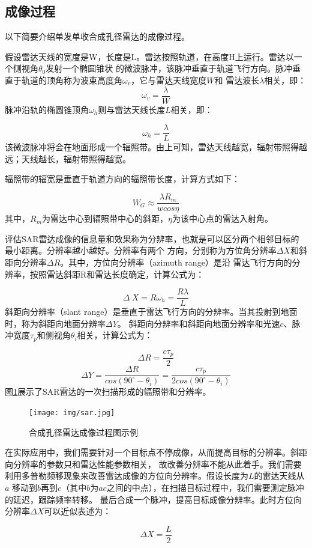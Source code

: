 \documentclass{xduugthesis}
\begin{document}
\subsection{成像过程}
以下简要介绍单发单收合成孔径雷达的成像过程\cite{SAR_Process}。\par
假设雷达天线的宽度是W，长度是L。雷达按照轨道，在高度H上运行。雷达以一个侧视角$\theta_0$发射一个椭圆锥状
的微波脉冲，该脉冲垂直于轨道飞行方向。脉冲垂直于轨道的顶角称为波束高度角$\omega_v$，它与雷达天线宽度$W$和
雷达波长$\lambda$相关，即：
\begin{equation}\omega_v=\frac{\lambda}{W}\end{equation}
脉冲沿轨的椭圆锥顶角$\omega_h$则与雷达天线长度$L$相关，即：\par
\begin{equation}\omega_h=\frac{\lambda}{L}\end{equation}
该微波脉冲将会在地面形成一个辐照带。由上可知，雷达天线越宽，辐射带照得越远；天线越长，辐射带照得越宽。\par
辐照带的辐宽是垂直于轨道方向的辐照带长度，计算方式如下：\par
\begin{equation}W_G\approx\frac{{\lambda}R_m}{wcos\eta}\end{equation}
其中，$R_m$为雷达中心到辐照带中心的斜距，$\eta$为该中心点的雷达入射角。\par
评估SAR雷达成像的信息量和效果称为分辨率，也就是可以区分两个相邻目标的最小距离。分辨率越小越好。分辨率有两个
方向，分别称为方位角分辨率$\Delta X$和斜距向分辨率$\Delta R$。其中，方位向分辨率（azimuth range）是沿
雷达飞行方向的分辨率，按照雷达斜距R和雷达长度确定，计算公式为：\par
\begin{equation}\Delta\ X=R\omega_h=\frac{R\lambda}{L}\end{equation}
斜距向分辨率（slant range）是垂直于雷达飞行方向的分辨率。当其投射到地面时，称为斜距向地面分辨率$\Delta Y$。
斜距向分辨率和斜距向地面分辨率和光速$c$、脉冲宽度$\tau_p$和侧视角$\theta_i$相关，计算公式为：\par
\begin{equation}\Delta R=\frac{c\tau_p}{2}\end{equation}
\begin{equation}\Delta Y=\frac{\Delta R}{cos(90^\circ-\theta_i)}=\frac{c\tau_p}{2cos(90^\circ-\theta_i)}\end{equation}
图\ref{SAR_Image}展示了SAR雷达的一次扫描形成的辐照带和分辨率。
\begin{figure}[!htb]
	\centering
	\texttt{[image: img/sar.jpg]}
	\caption{合成孔径雷达成像过程图示例}\label{SAR_Image}
\end{figure}\par
在实际应用中，我们需要针对一个目标点不停成像，从而提高目标的分辨率。斜距向分辨率的参数只和雷达性能参数相关，
故改善分辨率不能从此着手。我们需要利用多普勒频移现象来改善雷达成像的方位向分辨率。假设长度为$L$的雷达天线从$a$
移动到$b$再到$c$（其中$b$为$a$$c$之间的中点），在扫描目标过程中，我们需要测定脉冲的延迟，跟踪频率转移。
最后合成一个脉冲，提高目标成像分辨率。此时方位向分辨率$\Delta X$可以近似表述为：\par
\begin{equation}\Delta X=\frac{L}{2}\end{equation}
\end{document}

